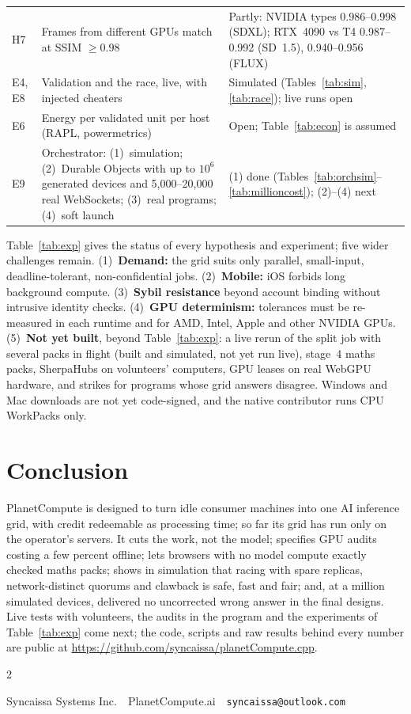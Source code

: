 \documentclass[11pt,a4paper]{article}
\makeatletter
\newcommand{\paperaffil}{Syncaissa Systems Inc.\ \textbullet\ PlanetCompute.ai}
\newcommand{\paperemail}{syncaissa@outlook.com}
\newcommand{\coderepo}{https://github.com/syncaissa/planetCompute.cpp}
\theoremstyle{definition}
\theoremstyle{plain}
\makeatother
\begin{document}
\begin{table}[!htb]
\begin{tabularx}{\linewidth}{@{}l>{\raggedright\arraybackslash}X>{\raggedright\arraybackslash}X@{}}
H7 & Frames from different GPUs match at SSIM $\ge0.98$ & Partly: NVIDIA types 0.986--0.998 (SDXL); RTX~4090 vs T4 0.987--0.992 (SD~1.5), 0.940--0.956 (FLUX) \\
E4, E8 & Validation and the race, live, with injected cheaters & Simulated (Tables~\ref{tab:sim}, \ref{tab:race}); live runs open \\
E6 & Energy per validated unit per host (RAPL, powermetrics) & Open; Table~\ref{tab:econ} is assumed \\
E9 & Orchestrator: (1)~simulation; (2)~Durable Objects with up to $10^6$ generated devices and 5{,}000--20{,}000 real WebSockets; (3)~real programs; (4)~soft launch & (1) done (Tables~\ref{tab:orchsim}--\ref{tab:millioncost}); (2)--(4) next \\
\bottomrule
\end{tabularx}
\end{table}


Table~\ref{tab:exp} gives the status of every hypothesis and experiment; five wider challenges remain.
(1)~\textbf{Demand:} the grid suits only parallel, small-input, deadline-tolerant, non-confidential jobs.
(2)~\textbf{Mobile:} iOS forbids long background compute.
(3)~\textbf{Sybil resistance} beyond account binding without intrusive identity checks. (4)~\textbf{GPU
determinism:} tolerances must be re-measured in each runtime and for AMD, Intel, Apple and other NVIDIA GPUs.
(5)~\textbf{Not yet built}, beyond Table~\ref{tab:exp}: a live rerun of the split job with several packs in
flight (built and simulated, not yet run live), stage~4 maths packs, SherpaHubs on volunteers' computers,
GPU leases on real WebGPU hardware, and strikes for programs whose grid answers disagree. Windows and Mac downloads are not yet code-signed, and the native contributor runs CPU WorkPacks only.

\section{Conclusion}

PlanetCompute is designed to turn idle consumer machines into one AI inference grid, with credit redeemable as
processing time; so far its grid has run only on the operator's servers. It cuts the work, not the model; specifies
GPU audits costing a few percent offline; lets browsers with no model compute exactly checked maths packs; shows in
simulation that racing with spare replicas, network-distinct quorums and clawback is safe, fast and fair; and, at a
million simulated devices, delivered no uncorrected wrong answer in the final designs. Live tests with volunteers,
the audits in the program and the experiments of Table~\ref{tab:exp} come next; the code, scripts and raw results
behind every number are public at \url{\coderepo}.


\begin{multicols}{2}

\end{multicols}
\nopagebreak\vspace{-2pt}
\centerline{\small \paperaffil\ \textbullet\ \texttt{\paperemail}}
\end{document}
